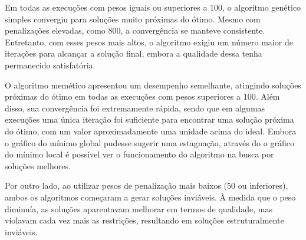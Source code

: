 


Em todas as execuções com pesos iguais ou superiores a 100, o algoritmo genético simples convergiu para soluções muito próximas do ótimo.
Mesmo com penalizações elevadas, como 800, a convergência se manteve consistente.
Entretanto, com esses pesos mais altos, o algoritmo exigiu um número maior de iterações para alcançar a solução final, embora a qualidade dessa tenha permanecido satisfatória.


O algoritmo memético apresentou um desempenho semelhante, atingindo soluções próximas do ótimo em todas as execuções com pesos superiores a 100. Além disso, sua convergência foi extremamente rápida, sendo que em algumas execuções uma única iteração foi suficiente para encontrar uma solução próxima do ótimo, com um valor aproximadamente uma unidade acima do ideal. Embora o gráfico do mínimo global pudesse sugerir uma estagnação, através do o gráfico do mínimo local é possível ver o funcionamento do algoritmo na busca por soluções melhores.

Por outro lado, ao utilizar pesos de penalização mais baixos (50 ou inferiores), ambos os algoritmos começaram a gerar soluções inviáveis. À medida que o peso diminuía, as soluções aparentavam melhorar em termos de qualidade, mas violavam cada vez mais as restrições, resultando em soluções estruturalmente inviáveis.



